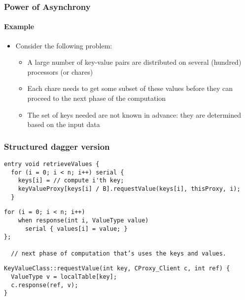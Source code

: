 \begin{frame}[fragile]

  \frametitle{Power of Asynchrony}
  \framesubtitle{Example}

  \begin{itemize}
    \item Consider the following problem:
    \begin{itemize}
      \item A large number of key-value pairs are distributed on several (hundred) processors  (or chares)
      \pause
      \item Each chare needs to get some subset of these values before they can proceed to the next phase of the computation
      \pause 
      \item The set of keys needed are not known in advance: they are determined based on the input data
    \end{itemize}
  \end{itemize}
\end{frame}

\begin{frame}[fragile]
  \frametitle{Structured dagger version}
  \begin{lstlisting}[basicstyle=\footnotesize]
entry void retrieveValues {
  for (i = 0; i < n; i++) serial {
    keys[i] = // compute i'th key;
    keyValueProxy[keys[i] / B].requestValue(keys[i], thisProxy, i);
  }
  \end{lstlisting}
  \pause
  \begin{lstlisting}[basicstyle=\footnotesize]
  for (i = 0; i < n; i++)
    when response(int i, ValueType value)
      serial { values[i] = value; }
};

  // next phase of computation that’s uses the keys and values.
  \end{lstlisting}
  \pause
  \begin{lstlisting}[basicstyle=\footnotesize]
KeyValueClass::requestValue(int key, CProxy_Client c, int ref) {
  ValueType v = localTable[key];
  c.response(ref, v);
}
  \end{lstlisting}
\end{frame}



